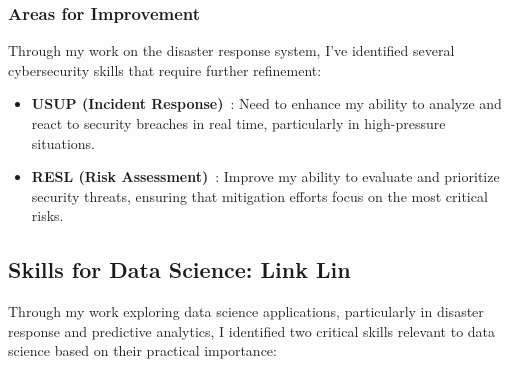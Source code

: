 \documentclass[a4paper, 11pt]{report}
\begin{document}
\subsubsection{Areas for Improvement}  
Through my work on the disaster response system, I've identified several cybersecurity skills that require further refinement:
\begin{itemize}
    \item \textbf{USUP (Incident Response)}~\cite{incident_response}: Need to enhance my ability to analyze and react to security breaches in real time, particularly in high-pressure situations.
    \item \textbf{RESL (Risk Assessment)}~\cite{risk_assessment}: Improve my ability to evaluate and prioritize security threats, ensuring that mitigation efforts focus on the most critical risks.
\end{itemize}  


\subsection*{Skills for Data Science: Link Lin}

Through my work exploring data science applications, particularly in disaster response and predictive analytics, I identified two critical skills relevant to data science based on their practical importance:
\end{document}
